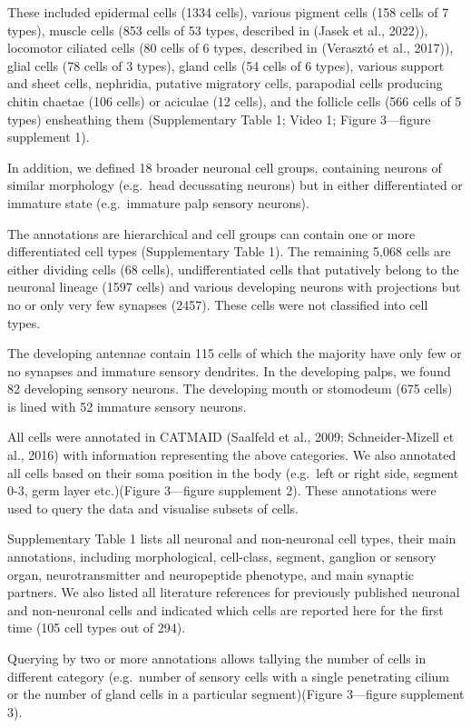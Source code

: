 \documentclass[
  11pt,
]{article}
\begin{document}
These included epidermal cells (1334 cells), various pigment cells (158
cells of 7 types), muscle cells (853 cells of 53 types, described in
(Jasek et al., 2022)), locomotor ciliated cells (80 cells of 6 types,
described in (Verasztó et al., 2017)), glial cells (78 cells of 3
types), gland cells (54 cells of 6 types), various support and sheet
cells, nephridia, putative migratory cells, parapodial cells producing
chitin chaetae (106 cells) or aciculae (12 cells), and the follicle
cells (566 cells of 5 types) ensheathing them (Supplementary Table 1;
Video 1; Figure 3---figure supplement 1).

In addition, we defined 18 broader neuronal cell groups, containing
neurons of similar morphology (e.g.~head decussating neurons) but in
either differentiated or immature state (e.g.~immature palp sensory
neurons).

The annotations are hierarchical and cell groups can contain one or more
differentiated cell types (Supplementary Table 1). The remaining 5,068
cells are either dividing cells (68 cells), undifferentiated cells that
putatively belong to the neuronal lineage (1597 cells) and various
developing neurons with projections but no or only very few synapses
(2457). These cells were not classified into cell types.

The developing antennae contain 115 cells of which the majority have
only few or no synapses and immature sensory dendrites. In the
developing palps, we found 82 developing sensory neurons. The developing
mouth or stomodeum (675 cells) is lined with 52 immature sensory
neurons.

All cells were annotated in CATMAID (Saalfeld et al., 2009;
Schneider-Mizell et al., 2016) with information representing the above
categories. We also annotated all cells based on their soma position in
the body (e.g.~left or right side, segment 0-3, germ layer etc.)(Figure
3---figure supplement 2). These annotations were used to query the data
and visualise subsets of cells.

Supplementary Table 1 lists all neuronal and non-neuronal cell types,
their main annotations, including morphological, cell-class, segment,
ganglion or sensory organ, neurotransmitter and neuropeptide phenotype,
and main synaptic partners. We also listed all literature references for
previously published neuronal and non-neuronal cells and indicated which
cells are reported here for the first time (105 cell types out of 294).

Querying by two or more annotations allows tallying the number of cells
in different category (e.g.~number of sensory cells with a single
penetrating cilium or the number of gland cells in a particular
segment)(Figure 3---figure supplement 3).
\end{document}
